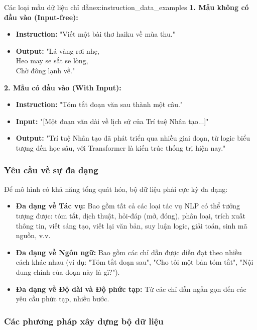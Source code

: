 \begin{example}{Các loại mẫu dữ liệu chỉ dẫn}{ex:instruction_data_examples}
    \textbf{1. Mẫu không có đầu vào (Input-free):}
    \begin{itemize}
        \item \textbf{Instruction:} "Viết một bài thơ haiku về mùa thu."
        \item \textbf{Output:} "Lá vàng rơi nhẹ, \\ Heo may se sắt se lòng, \\ Chờ đông lạnh về."
    \end{itemize}

    \textbf{2. Mẫu có đầu vào (With Input):}
    \begin{itemize}
        \item \textbf{Instruction:} "Tóm tắt đoạn văn sau thành một câu."
        \item \textbf{Input:} "[Một đoạn văn dài về lịch sử của Trí tuệ Nhân tạo...]"
        \item \textbf{Output:} "Trí tuệ Nhân tạo đã phát triển qua nhiều giai đoạn, từ logic biểu tượng đến học sâu, với Transformer là kiến trúc thống trị hiện nay."
    \end{itemize}
\end{example}

\subsubsection{Yêu cầu về sự đa dạng}
Để mô hình có khả năng tổng quát hóa, bộ dữ liệu phải cực kỳ đa dạng:
\begin{itemize}
    \item \textbf{Đa dạng về Tác vụ:} Bao gồm tất cả các loại tác vụ NLP có thể tưởng tượng được: tóm tắt, dịch thuật, hỏi-đáp (mở, đóng), phân loại, trích xuất thông tin, viết sáng tạo, viết lại văn bản, suy luận logic, giải toán, sinh mã nguồn, v.v.
    \item \textbf{Đa dạng về Ngôn ngữ:} Bao gồm các chỉ dẫn được diễn đạt theo nhiều cách khác nhau (ví dụ: "Tóm tắt đoạn sau", "Cho tôi một bản tóm tắt", "Nội dung chính của đoạn này là gì?").
    \item \textbf{Đa dạng về Độ dài và Độ phức tạp:} Từ các chỉ dẫn ngắn gọn đến các yêu cầu phức tạp, nhiều bước.
\end{itemize}

\subsubsection{Các phương pháp xây dựng bộ dữ liệu}

